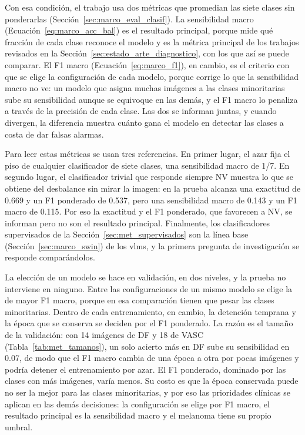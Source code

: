 Con esa condición, el trabajo usa dos métricas que promedian las siete clases sin ponderarlas
(Sección~\ref{sec:marco_eval_clasif}). La sensibilidad macro (Ecuación~\ref{eq:marco_acc_bal}) es el resultado
principal, porque mide qué fracción de cada clase reconoce el modelo y es la métrica principal de los trabajos
revisados en la Sección~\ref{sec:estado_arte_diagnostico}, con los que así se puede comparar. El F1 macro
(Ecuación~\ref{eq:marco_f1}), en cambio, es el criterio con que se elige la configuración de cada modelo, porque
corrige lo que la sensibilidad macro no ve: un modelo que asigna muchas imágenes a las clases minoritarias sube su
sensibilidad aunque se equivoque en las demás, y el F1 macro lo penaliza a través de la precisión de cada clase. Las
dos se informan juntas, y cuando divergen, la diferencia muestra cuánto gana el modelo en detectar las clases a costa
de dar falsas alarmas.

Para leer estas métricas se usan tres referencias. En primer lugar, el azar fija el piso de cualquier clasificador de
siete clases, una sensibilidad macro de 1/7. En segundo lugar, el clasificador trivial que responde siempre NV muestra
lo que se obtiene del desbalance sin mirar la imagen: en la prueba alcanza una exactitud de 0.669 y un F1 ponderado de
0.537, pero una sensibilidad macro de 0.143 y un F1 macro de 0.115. Por eso la exactitud y el F1 ponderado, que
favorecen a NV, se informan pero no son el resultado principal. Finalmente, los clasificadores supervisados de la
Sección~\ref{sec:met_supervisados} son la línea base (Sección~\ref{sec:marco_swin}) de los \glspl{vlm}, y la primera
pregunta de investigación se responde comparándolos.

La elección de un modelo se hace en validación, en dos niveles, y la prueba no interviene en ninguno. Entre las
configuraciones de un mismo modelo se elige la de mayor F1 macro, porque en esa comparación tienen que pesar las clases
minoritarias. Dentro de cada entrenamiento, en cambio, la detención temprana y la época que se conserva se deciden por
el F1 ponderado. La razón es el tamaño de la validación: con 14 imágenes de DF y 18 de VASC
(Tabla~\ref{tab:met_tamanos}), un solo acierto más en DF sube su sensibilidad en 0.07, de modo que el F1 macro cambia
de una época a otra por pocas imágenes y podría detener el entrenamiento por azar. El F1 ponderado, dominado por las
clases con más imágenes, varía menos. Su costo es que la época conservada puede no ser la mejor para las clases
minoritarias, y por eso las prioridades clínicas se aplican en las demás decisiones: la configuración se elige por F1
macro, el resultado principal es la sensibilidad macro y el melanoma tiene su propio umbral.

